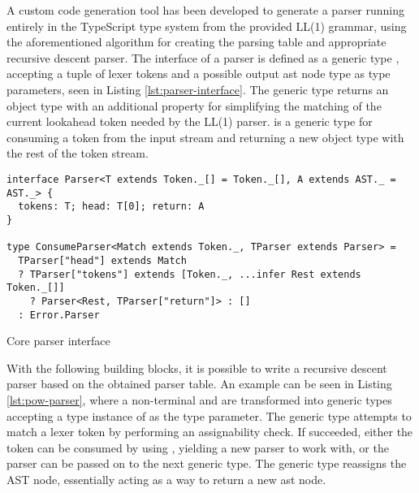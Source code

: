 \clearpage 

A custom code generation tool has been developed to generate a parser running entirely in the TypeScript type system from the provided LL(1) grammar, using the aforementioned algorithm for creating the parsing table and appropriate recursive descent parser. The interface of a parser is defined as a generic type , accepting a tuple of lexer tokens and a possible output \acrshort{ast} node type as type parameters, seen in Listing \ref{lst:parser-interface}. The generic type returns an object type with an additional  property for simplifying the matching of the current lookahead token needed by the LL(1) parser.  is a generic type for consuming a token from the input stream and returning a new object type with the rest of the token stream.

\begin{listing}[ht]
  \begin{verbatim}
interface Parser<T extends Token._[] = Token._[], A extends AST._ = AST._> {
  tokens: T; head: T[0]; return: A
}

type ConsumeParser<Match extends Token._, TParser extends Parser> = 
  TParser["head"] extends Match
  ? TParser["tokens"] extends [Token._, ...infer Rest extends Token._[]]
    ? Parser<Rest, TParser["return"]> : []
  : Error.Parser
\end{verbatim}
  \caption{Core parser interface}\label{lst:parser-interface}
\end{listing}

With the following building blocks, it is possible to write a recursive descent parser based on the obtained parser table. An example can be seen in Listing \ref{lst:pow-parser}, where a non-terminal  and  are transformed into generic types accepting a type instance of  as the type parameter. The generic type attempts to match a lexer token by performing an assignability check. If succeeded, either the token can be consumed by using , yielding a new parser to work with, or the parser can be passed on to the next generic type. The  generic type reassigns the AST node, essentially acting as a way to return a new \acrshort{ast} node.

